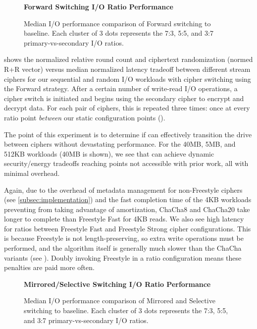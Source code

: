\begin{figure}[ht]
  \textbf{Forward Switching I/O Ratio Performance}\par\medskip
  {} \caption{Median I/O performance
  comparison of Forward switching to baseline. Each cluster of 3 dots represents
  the 7:3, 5:5, and 3:7 primary-vs-secondary I/O ratios.}
 \label{fig:tradeoff-with-ratios}
\end{figure}

 shows the normalized relative round count and
ciphertext randomization (normed R+R vector) versus median normalized latency
tradeoff between different stream ciphers for our sequential and random I/O
workloads with cipher switching using the Forward strategy. After a certain
number of write-read I/O operations, a cipher switch is initiated and
\sys{} begins using the secondary cipher to encrypt and decrypt data. For
each pair of ciphers, this is repeated three times: once at every ratio point
\emph{between} our static configuration points ().

The point of this experiment is to determine if \sys{} can effectively
transition the drive between ciphers without devastating performance. For the
40MB, 5MB, and 512KB workloads (40MB is shown), we see that \sys{} can
achieve dynamic security/energy tradeoffs reaching points not accessible with
prior work, all with minimal overhead.

Again, due to the overhead of metadata management for non-Freestyle ciphers (see
\cref{subsec:implementation}) and the fast completion time of the 4KB workloads
preventing \sys{} from taking advantage of amortization, ChaCha8 and
ChaCha20 take longer to complete than Freestyle Fast for 4KB reads. We also see
high latency for ratios between Freestyle Fast and Freestyle Strong cipher
configurations. This is because Freestyle is not length-preserving, so extra
write operations must be performed, and the algorithm itself is generally much
slower than the ChaCha variants (see ). Doubly
invoking Freestyle in a ratio configuration means these penalties are paid more
often.

\begin{figure}[ht]
  \textbf{Mirrored/Selective Switching I/O Ratio Performance}\par\medskip
  \centering
  {} \caption{Median I/O performance
  comparison of Mirrored and Selective switching to baseline. Each cluster of 3
  dots represents the 7:3, 5:5, and 3:7 primary-vs-secondary I/O ratios.}
 \label{fig:mirrored-selective-baseline}
\end{figure}

